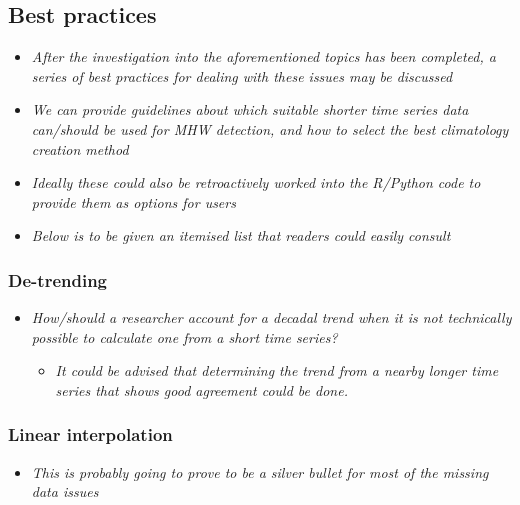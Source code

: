 \documentclass[]{article}
\providecommand{\tightlist}{%
  \setlength{\itemsep}{0pt}\setlength{\parskip}{0pt}}
\begin{document}
\subsection{Best practices}\label{best-practices}

\begin{itemize}
\tightlist
\item
  \emph{After the investigation into the aforementioned topics has been
  completed, a series of best practices for dealing with these issues
  may be discussed}
\item
  \emph{We can provide guidelines about which suitable shorter time
  series data can/should be used for MHW detection, and how to select
  the best climatology creation method}
\item
  \emph{Ideally these could also be retroactively worked into the
  R/Python code to provide them as options for users}
\item
  \emph{Below is to be given an itemised list that readers could easily
  consult}
\end{itemize}

\subsubsection{De-trending}\label{de-trending}

\begin{itemize}
\tightlist
\item
  \emph{How/should a researcher account for a decadal trend when it is
  not technically possible to calculate one from a short time series?}

  \begin{itemize}
  \tightlist
  \item
    \emph{It could be advised that determining the trend from a nearby
    longer time series that shows good agreement could be done.}
  \end{itemize}
\end{itemize}

\subsubsection{Linear interpolation}\label{linear-interpolation}

\begin{itemize}
\tightlist
\item
  \emph{This is probably going to prove to be a silver bullet for most
  of the missing data issues}
\end{itemize}
\end{document}
